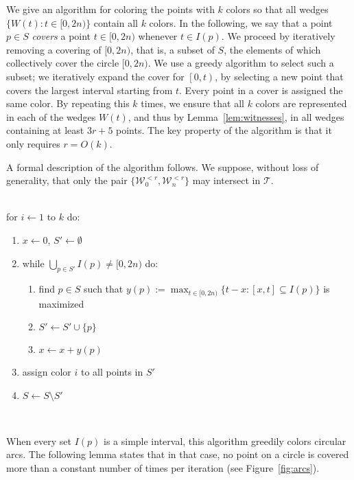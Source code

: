 \documentclass[english,11pt]{article}
\newcommand{\bigt}{\mathcal T}
\newcommand{\bigw}{\mathcal W}
\begin{document}
We give an algorithm for coloring the points with $k$ colors so that all wedges $\{ W(t) : t\in [0,2n)\}$ contain all $k$ colors. In the following, we say that a point $p\in S$ {\em covers} a point $t\in [0,2n)$ whenever $t\in I (p)$. We proceed by iteratively removing a covering of $[0,2n)$, that is, a subset of $S$, the elements of which collectively cover the circle $[0,2n)$. We use a greedy algorithm to select such a subset; we iteratively expand the cover for $\left[0,t\right)$, by selecting a new point that covers the largest interval starting from $t$. Every point in a cover is assigned the same color. By repeating this $k$ times, we ensure that all $k$ colors are represented in each of the wedges $W(t)$, and thus by Lemma~\ref{lem:witnesses}, in all wedges containing at least $3r{+}5$ points. The key property of the algorithm is that it only requires $r=O(k)$.

A formal description of the algorithm follows. We suppose, without loss of generality, that only the pair $\{\bigw_{0}^{<r}, \bigw_{n}^{<r}\}$ may intersect in $\bigt$.\medskip

\noindent \begin{minipage}{\textwidth}
\\

\noindent for $i\gets 1$ to $k$ do:
\begin{enumerate}
  \item $x\gets 0$, $S'\gets \emptyset$
  \item while $\bigcup_{p\in S'} I(p)\not= [0,2n)$ do:
  \begin{enumerate}
     \item find $p\in S 
     $ such that $y(p) := \max_{t\in [0,2n)} \{ t{-}x : [x,t]\subseteq I(p) \}$ is maximized
     \item $S'\gets S' \cup \{ p \}$
     \item $x\gets x {+} y(p)$
  \end{enumerate}
  \item assign color $i$ to all points in $S'$
  \item $S\gets S \setminus S'$
\end{enumerate}
~
\end{minipage}

When every set $I(p)$ is a simple interval, this algorithm greedily colors circular arcs. The following lemma states that in that case, no point on a circle is covered more than a constant number of times per iteration (see Figure~\ref{fig:arcs}).
\end{document}
